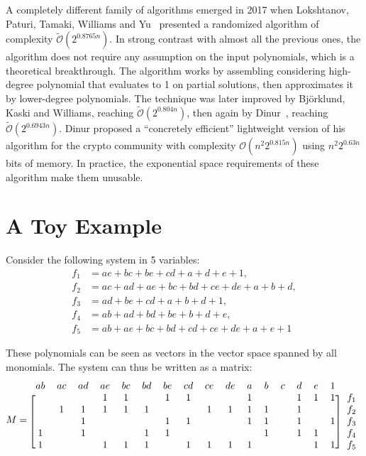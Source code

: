 \documentclass[a4paper,UKenglish,cleveref, autoref]{lipics-v2019}
\newcommand{\bigO}[1]{\ensuremath{\mathcal{O}\left( #1 \right)} }
\newcommand{\bigOsoft}[1]{\ensuremath{\mathcal{\tilde O}\left( #1 \right)} }
\begin{document}
A completely different family of algorithms emerged in 2017 when Lokshtanov,
Paturi, Tamaki, Williams and Yu~\cite{LokshtanovPTWY17} presented a randomized
algorithm of complexity $\bigOsoft{2^{0.8765n}}$. In strong contrast with almost
all the previous ones, the algorithm does not require any assumption on the
input polynomials, which is a theoretical breakthrough. The algorithm works by
assembling considering high-degree polynomial that evaluates to 1 on partial
solutions, then approximates it by lower-degree polynomials. The technique was
later improved by Björklund, Kaski and Williams, reaching
$\bigOsoft{2^{0.804n}}$, then again by Dinur~\cite{Dinur21}, reaching
$\bigOsoft{2^{0.6943n}}$. Dinur proposed a ``concretely efficient'' lightweight
version of his algorithm for the crypto community with complexity
$\bigO{n^2 2^{0.815n}}$ using $n^2 2^{0.63n}$ bits of memory. In practice, the
exponential space requirements of these algorithm make them unusable.


\section{A Toy Example}

Consider the following system in 5 variables:
\begin{align*}
  f_1 &= ae + bc + be + cd + a + d + e + 1,\\
  f_2 &= ac + ad + ae + bc + bd + ce + de + a + b + d,\\
  f_3 &= ad + be + cd  + a + b + d + 1,\\
  f_4 &= ab + ad + bd + be + b + d + e,\\            
  f_5 &= ab + ae + bc + bd + cd + ce + de + a + e + 1
\end{align*}



These polynomials can be seen as vectors in the vector space spanned by all
monomials. The system can thus be written as a matrix:
\[
  M = \begin{blockarray}{ccccccccccccccccc}
  ab & ac & ad & ae & bc & bd & be & cd & ce & de & a & b & c & d & e & 1 & \\
  \begin{block}{[cccccccccccccccc]c}
     &    &    & 1  & 1  &    & 1  & 1  &    &    & 1 &   &   & 1 & 1 & 1 & f_1\\
     & 1  & 1  & 1  & 1  & 1  &    &    & 1  & 1  & 1 & 1 &   & 1 &   &   & f_2 \\
     &    & 1  &    &    &    & 1  & 1  &    &    & 1 & 1 &   & 1 &   & 1 & f_3 \\
   1 &    & 1  &    &    & 1  & 1  &    &    &    &   & 1 &   & 1 & 1 &   & f_4 \\
   1 &    &    & 1  & 1  & 1  &    & 1  & 1  & 1  & 1 &   &   &   & 1 & 1 & f_5 \\
    \end{block}
\end{blockarray}
\]
\end{document}

